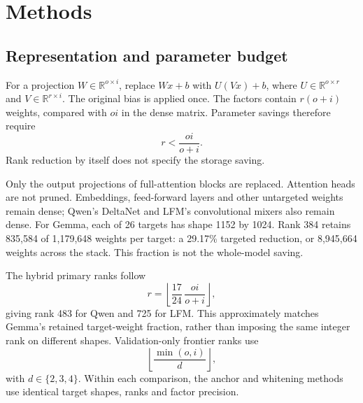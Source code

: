 \documentclass[conference]{IEEEtran}
\begin{document}
\section{Methods}
\subsection{Representation and parameter budget}
For a projection $W\in\mathbb{R}^{o\times i}$, replace $Wx+b$ with $U(Vx)+b$, where $U\in\mathbb{R}^{o\times r}$ and $V\in\mathbb{R}^{r\times i}$. The original bias is applied once. The factors contain $r(o+i)$ weights, compared with $oi$ in the dense matrix. Parameter savings therefore require
\begin{equation}r<\frac{oi}{o+i}.\end{equation}
Rank reduction by itself does not specify the storage saving.\par\smallskip
Only the output projections of full-attention blocks are replaced. Attention heads are not pruned. Embeddings, feed-forward layers and other untargeted weights remain dense; Qwen's DeltaNet and LFM's convolutional mixers also remain dense. For Gemma, each of 26 targets has shape 1152 by 1024. Rank 384 retains 835,584 of 1,179,648 weights per target: a 29.17\% targeted reduction, or 8,945,664 weights across the stack. This fraction is not the whole-model saving.\par\smallskip
The hybrid primary ranks follow
\begin{equation}r=\left\lfloor\frac{17}{24}\,\frac{oi}{o+i}\right\rfloor,\end{equation}
giving rank 483 for Qwen and 725 for LFM. This approximately matches Gemma's retained target-weight fraction, rather than imposing the same integer rank on different shapes. Validation-only frontier ranks use
\begin{equation}\left\lfloor\frac{\min(o,i)}{d}\right\rfloor,\end{equation}
with $d\in\{2,3,4\}$. Within each comparison, the anchor and whitening methods use identical target shapes, ranks and factor precision.\par\smallskip
\end{document}
